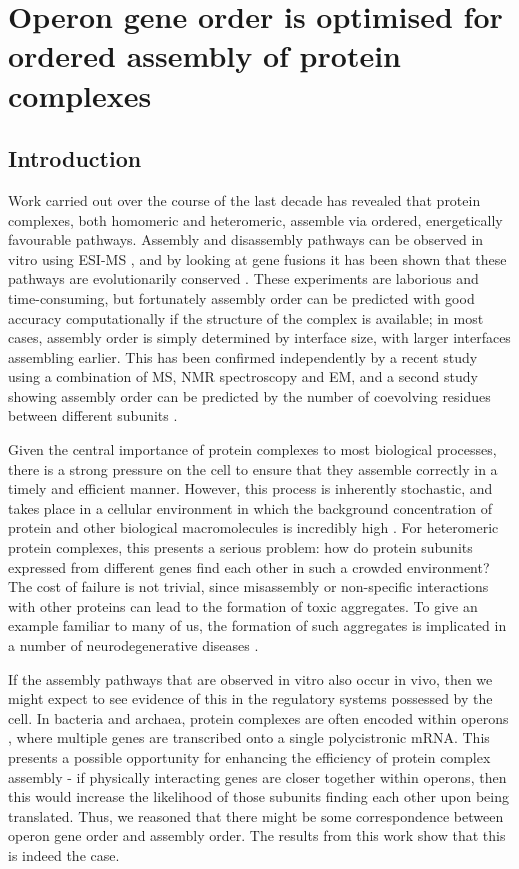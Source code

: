 \documentclass[a4paper,11pt,twoside,openright]{scrbook}
\begin{document}
\chapter{Operon gene order is optimised for ordered assembly of protein complexes}\label{chapter:operons}

\section{Introduction}
Work carried out over the course of the last decade has revealed that protein complexes, both homomeric and heteromeric, assemble via ordered, energetically favourable pathways. Assembly and disassembly pathways can be observed in vitro using ESI-MS \cite{Hernandez2007}, and by looking at gene fusions it has been shown that these pathways are evolutionarily conserved \cite{Levy2008,Marsh2013}. These experiments are laborious and time-consuming, but fortunately assembly order can be predicted with good accuracy computationally if the structure of the complex is available; in most cases, assembly order is simply determined by interface size, with larger interfaces assembling earlier. This has been confirmed independently by a recent study using a combination of MS, NMR spectroscopy and EM, and a second study showing assembly order can be predicted by the number of coevolving residues between different subunits \cite{Macek2017,Mallik2017}.

Given the central importance of protein complexes to most biological processes, there is a strong pressure on the cell to ensure that they assemble correctly in a timely and efficient manner. However, this process is inherently stochastic, and takes place in a cellular environment in which the background concentration of protein and other biological macromolecules is incredibly high \cite{Swain2002}. For heteromeric protein complexes, this presents a serious problem: how do protein subunits expressed from different genes find each other in such a crowded environment? The cost of failure is not trivial, since misassembly or non-specific interactions with other proteins can lead to the formation of toxic aggregates. To give an example familiar to many of us, the formation of such aggregates is implicated in a number of neurodegenerative diseases \cite{Ross2004a}.

If the assembly pathways that are observed in vitro also occur in vivo, then we might expect to see evidence of this in the regulatory systems possessed by the cell. In bacteria and archaea, protein complexes are often encoded within operons \cite{Mushegian1996,Dandekar1998}, where multiple genes are transcribed onto a single polycistronic mRNA. This presents a possible opportunity for enhancing the efficiency of protein complex assembly - if physically interacting genes are closer together within operons, then this would increase the likelihood of those subunits finding each other upon being translated. Thus, we reasoned that there might be some correspondence between operon gene order and assembly order. The results from this work show that this is indeed the case.
\end{document}
